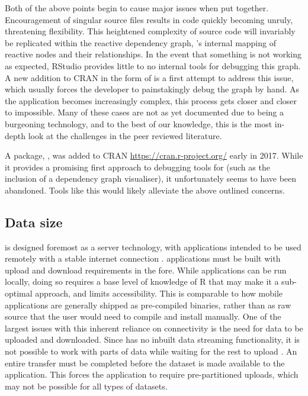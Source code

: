 Both of the above points begin to cause major issues when put together.  Encouragement of singular source files results in code quickly becoming unruly, threatening flexibility.  This heightened complexity of source code will invariably be replicated within the reactive dependency graph, 's internal mapping of reactive nodes and their relationships.  In the event that something is not working as expected, RStudio provides little to no internal tools for debugging this graph.  A new addition to CRAN in the form of  \citep{schloerke_reactlog_2019} is a first attempt to address this issue, which usually forces the developer to painstakingly debug the graph by hand.  As the application becomes increasingly complex, this process gets closer and closer to impossible.  Many of these cases are not as yet documented due to  being a burgeoning technology, and to the best of our knowledge, this is the most in-depth look at the challenges in the peer reviewed literature.

A package,  \citep{kohli_shinytesterfunctions_2017}, was added to CRAN \url{https://cran.r-project.org/} early in 2017.  While it provides a promising first approach to debugging tools for  (such as the inclusion of a dependency graph visualiser), it unfortunately seems to have been abandoned.  Tools like this would likely alleviate the above outlined concerns.

\subsection{Data size}

 is designed foremost as a server technology, with applications intended to be used remotely with a stable internet connection \citep{core_team_shiny_2017}.   applications must be built with upload and download requirements in the fore.  While  applications can be run locally, doing so requires a base level of knowledge of R that may make it a sub-optimal approach, and limits accessibility.  This is comparable to how mobile applications are generally shipped as pre-compiled binaries, rather than as raw source that the user would need to compile and install manually.  One of the largest issues with this inherent reliance on connectivity is the need for data to be uploaded and downloaded.  Since  has no inbuilt data streaming functionality, it is not possible to work with parts of data while waiting for the rest to upload \citep{core_team_shiny_2017}. An entire transfer must be completed before the dataset is made available to the application. This forces the application to require pre-partitioned uploads, which may not be possible for all types of datasets.

